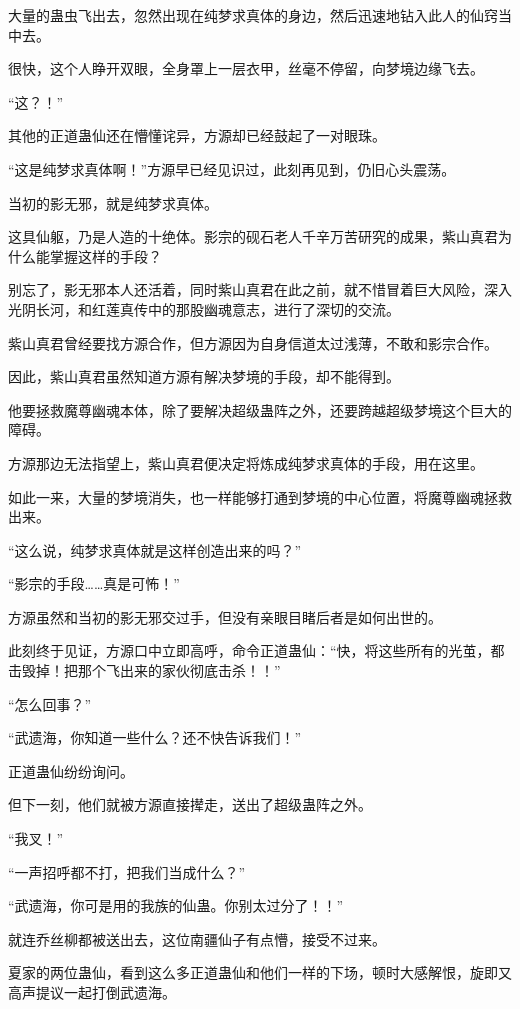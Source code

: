\begin{this_body}
大量的蛊虫飞出去，忽然出现在纯梦求真体的身边，然后迅速地钻入此人的仙窍当中去。

很快，这个人睁开双眼，全身罩上一层衣甲，丝毫不停留，向梦境边缘飞去。

“这？！”

其他的正道蛊仙还在懵懂诧异，方源却已经鼓起了一对眼珠。

“这是纯梦求真体啊！”方源早已经见识过，此刻再见到，仍旧心头震荡。

当初的影无邪，就是纯梦求真体。

这具仙躯，乃是人造的十绝体。影宗的砚石老人千辛万苦研究的成果，紫山真君为什么能掌握这样的手段？

别忘了，影无邪本人还活着，同时紫山真君在此之前，就不惜冒着巨大风险，深入光阴长河，和红莲真传中的那股幽魂意志，进行了深切的交流。

紫山真君曾经要找方源合作，但方源因为自身信道太过浅薄，不敢和影宗合作。

因此，紫山真君虽然知道方源有解决梦境的手段，却不能得到。

他要拯救魔尊幽魂本体，除了要解决超级蛊阵之外，还要跨越超级梦境这个巨大的障碍。

方源那边无法指望上，紫山真君便决定将炼成纯梦求真体的手段，用在这里。

如此一来，大量的梦境消失，也一样能够打通到梦境的中心位置，将魔尊幽魂拯救出来。

“这么说，纯梦求真体就是这样创造出来的吗？”

“影宗的手段……真是可怖！”

方源虽然和当初的影无邪交过手，但没有亲眼目睹后者是如何出世的。

此刻终于见证，方源口中立即高呼，命令正道蛊仙：“快，将这些所有的光茧，都击毁掉！把那个飞出来的家伙彻底击杀！！”

“怎么回事？”

“武遗海，你知道一些什么？还不快告诉我们！”

正道蛊仙纷纷询问。

但下一刻，他们就被方源直接撵走，送出了超级蛊阵之外。

“我叉！”

“一声招呼都不打，把我们当成什么？”

“武遗海，你可是用的我族的仙蛊。你别太过分了！！”

就连乔丝柳都被送出去，这位南疆仙子有点懵，接受不过来。

夏家的两位蛊仙，看到这么多正道蛊仙和他们一样的下场，顿时大感解恨，旋即又高声提议一起打倒武遗海。


\end{this_body}
